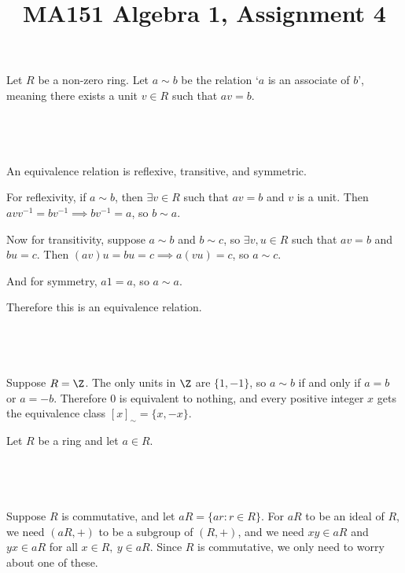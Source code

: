 \documentclass[a4paper]{article}
\title{MA151 Algebra 1, Assignment 4}
\begin{document}
\maketitle

\setlength{\parindent}{0em}
\setlength{\parskip}{1em}


Let $R$ be a non-zero ring. Let $a \sim b$ be the relation \enquote*{$a$ is an associate of $b$}, meaning there exists a unit $v \in R$ such that $av = b$.

\subsection{~}

An equivalence relation is reflexive, transitive, and symmetric.

For reflexivity, if $a \sim b$, then $\exists v \in R$ such that $av = b$ and $v$ is a unit. Then $a v v^{-1} = b v^{-1} \implies b v^{-1} = a$, so $b \sim a$.

Now for transitivity, suppose $a \sim b$ and $b \sim c$, so $\exists v, u \in R$ such that $av = b$ and $bu = c$. Then $(av) u = bu = c \implies a (vu) = c$, so $a \sim c$.

And for symmetry, $a 1 = a$, so $a \sim a$.

Therefore this is an equivalence relation.

\subsection{~}

Suppose $R = \Z$. The only units in $\Z$ are $\{1, -1\}$, so $a \sim b$ if and only if $a = b$ or $a = -b$. Therefore $0$ is equivalent to nothing, and every positive integer $x$ gets the equivalence class $[x]_\sim = \{x, -x\}$.


Let $R$ be a ring and let $a \in R$.

\subsection{~}

Suppose $R$ is commutative, and let $aR = \{ar : r \in R\}$. For $aR$ to be an ideal of $R$, we need $(aR, +)$ to be a subgroup of $(R, +)$, and we need $xy \in aR$ and $yx \in aR$ for all $x \in R,\ y \in aR$. Since $R$ is commutative, we only need to worry about one of these.
\end{document}
